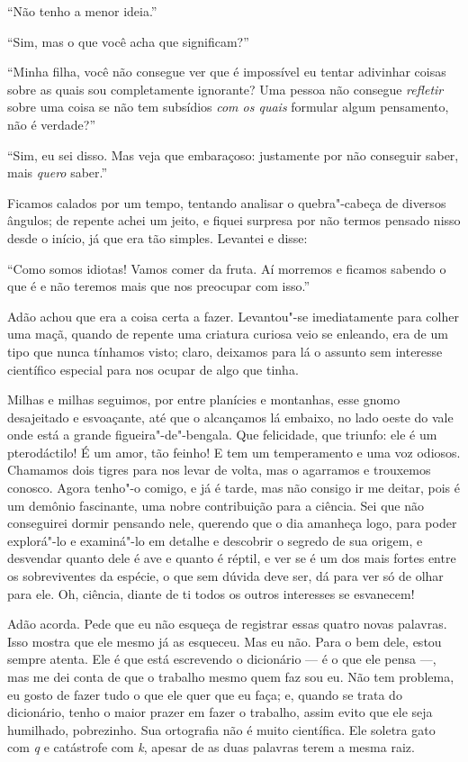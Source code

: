“Não tenho a menor ideia.”

“Sim, mas o que você acha que significam?”

“Minha filha, você não consegue ver que é impossível eu tentar adivinhar
coisas sobre as quais sou
completamente ignorante? Uma pessoa não consegue \textit{refletir} sobre uma coisa se
não tem subsídios \textit{com os quais} formular algum pensamento, não
é verdade?”

“Sim, eu sei disso. Mas veja que embaraçoso: justamente por não conseguir
saber, mais \textit{quero} saber.”

Ficamos calados por um tempo, tentando analisar o quebra"-cabeça de diversos
ângulos; de repente achei um jeito, e fiquei surpresa por não termos pensado
nisso desde o início, já que era tão simples. Levantei e disse:

“Como somos idiotas! Vamos comer da fruta. Aí morremos e ficamos sabendo o que é e
não teremos mais que nos preocupar com isso.”

Adão achou que era a coisa certa a fazer. Levantou"-se imediatamente para colher
uma maçã, quando de repente uma criatura curiosa veio se enleando, era de um
tipo que nunca tínhamos visto; claro, deixamos para lá o assunto sem interesse
científico especial para nos ocupar de algo que tinha.

Milhas e milhas seguimos, por entre planícies e montanhas, esse gnomo desajeitado e esvoaçante, até
que o alcançamos lá embaixo, no lado oeste do vale onde está a grande figueira"-de"-bengala. 
Que felicidade, que triunfo: ele é um
pterodáctilo! É um amor, tão feinho! E tem um temperamento e uma voz odiosos.
Chamamos dois tigres para nos levar de volta, mas o agarramos e trouxemos
conosco. Agora tenho"-o comigo, e já é tarde, mas não consigo ir me deitar, pois é
um demônio fascinante, uma nobre contribuição para a ciência. Sei que não
conseguirei dormir pensando nele, querendo que o dia amanheça logo, para poder
explorá"-lo e examiná"-lo em detalhe e descobrir o segredo de sua origem, e
desvendar quanto dele é ave e quanto é réptil, e ver se é um dos mais fortes
entre os sobreviventes da espécie, o que sem dúvida deve ser, dá para ver só de
olhar para ele. Oh, ciência, diante de ti todos os outros interesses se esvanecem!

Adão acorda. Pede que eu não esqueça de registrar essas quatro novas palavras. Isso
mostra que ele mesmo já as esqueceu. Mas eu não. Para o bem dele, estou sempre
atenta. Ele é que está escrevendo o dicionário --- é o que ele pensa ---, mas
me dei conta de que o trabalho mesmo quem faz sou eu. Não tem problema, eu gosto
de fazer tudo o que ele quer que eu faça; e, quando se trata do dicionário,
tenho o maior prazer em fazer o trabalho, assim evito que ele seja humilhado,
pobrezinho. Sua ortografia não é muito científica. Ele soletra gato com \textit{q} e
catástrofe com \textit{k}, apesar de as duas palavras terem a mesma raiz.

